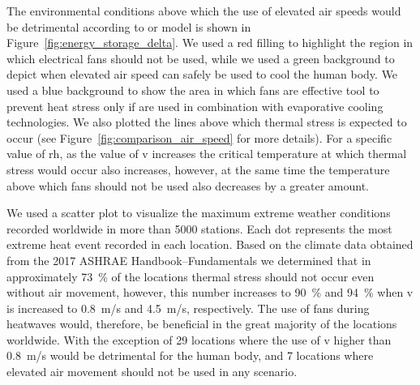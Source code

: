 The environmental conditions above which the use of elevated air speeds would be detrimental according to or model is shown in Figure~\ref{fig:energy_storage_delta}.
We used a red filling to highlight the region in which electrical fans should not be used, while we used a green background to depict when elevated air speed can safely be used to cool the human body.
We used a blue background to show the area in which fans are effective tool to prevent heat stress only if are used in combination with evaporative cooling technologies.
We also plotted the lines above which thermal stress is expected to occur (see Figure~\ref{fig:comparison_air_speed} for more details). 
For a specific value of \ac{rh}, as the value of \ac{v} increases the critical temperature at which thermal stress would occur also increases, however, at the same time the temperature above which fans should not be used also decreases by a greater amount.

We used a scatter plot to visualize the maximum extreme weather conditions recorded worldwide in more than 5000 stations.
Each dot represents the most extreme heat event recorded in each location.
Based on the climate data obtained from the 2017 ASHRAE Handbook--Fundamentals we determined that in approximately 73~\% of the locations thermal stress should not occur even without air movement, however, this number increases to 90~\% and 94~\% when \ac{v} is increased to 0.8~m/s and 4.5~m/s, respectively.
The use of fans during heatwaves would, therefore, be beneficial in the great majority of the locations worldwide.
With the exception of 29 locations where the use of \ac{v} higher than 0.8~m/s would be detrimental for the human body, and 7 locations where elevated air movement should not be used in any scenario.



